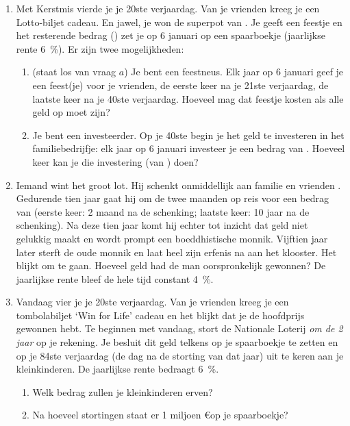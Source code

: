 \begin{enumerate}
    \item Met Kerstmis vierde je je 20ste verjaardag. Van je
    vrienden kreeg je een Lotto-biljet cadeau. En jawel, je won de
    superpot van . Je geeft een feestje en het
    resterende bedrag () zet je op 6 januari op een
    spaarboekje (jaarlijkse rente \SI{6}{\percent}). Er zijn twee mogelijkheden:
    \begin{enumerate}
    \item (staat los van vraag $a$) 
    Je bent een feestneus. Elk jaar op 6 januari geef je een feest(je) voor je vrienden, de eerste keer na je 21ste verjaardag, de laatste keer na je 40ste verjaardag. Hoeveel mag dat feestje kosten als alle geld op moet zijn?
    \item  Je bent een investeerder. Op je 40ste begin je het geld te
    investeren in het familiebedrijfje: elk jaar  op 6 januari 
    investeer je een bedrag van
    . Hoeveel keer kan je die
    investering (van ) doen?
    \end{enumerate}
    
    \item Iemand wint het groot lot. Hij schenkt onmiddellijk aan 
    familie en vrienden . Gedurende tien jaar gaat hij 
    om de twee maanden op reis voor een bedrag van  (eerste keer: 2 maand na de schenking; laatste keer: 10 jaar na de schenking). Na 
    deze tien jaar komt hij echter tot inzicht dat geld niet gelukkig 
    maakt en wordt prompt een boeddhistische monnik. Vijftien jaar 
    later sterft de oude monnik en laat heel zijn erfenis na aan het 
    klooster. Het blijkt om  te gaan. Hoeveel geld 
    had de man oorspronkelijk gewonnen? De jaarlijkse rente bleef de 
    hele tijd constant \SI{4}{\percent}.

    \item Vandaag vier je je 20ste verjaardag. Van je vrienden
    kreeg je een tombolabiljet `Win for Life' cadeau en het blijkt
    dat je de hoofdprijs gewonnen hebt. Te beginnen met vandaag, stort
    de Nationale Loterij \emph{om de 2 jaar}  op je rekening. Je
    besluit dit geld telkens op je spaarboekje te zetten en op je
    84ste verjaardag (de dag na de storting van dat jaar) uit te keren
    aan je kleinkinderen. De jaarlijkse rente bedraagt \SI{6}{\percent}.
    \begin{enumerate}
    \item Welk bedrag zullen je kleinkinderen erven?
    \item Na hoeveel stortingen staat er 1 miljoen \euro op je spaarboekje?
    \end{enumerate}
    

\end{enumerate}
